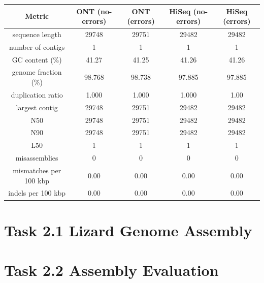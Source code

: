 \documentclass[12pt]{article}
\begin{document}
\begin{center}
\begin{tabular}{ |c|c|c|c|c| }
    \hline
    Metric & ONT (no-errors) & ONT (errors) & HiSeq (no-errors) & HiSeq (errors) \\
    \hline
    sequence length & 29748 & 29751 & 29482 & 29482 \\
    number of contigs & 1 & 1 & 1 & 1 \\
    GC content (\%) & 41.27 & 41.25 & 41.26 & 41.26  \\
    genome fraction (\%) & 98.768 & 98.738 & 97.885  & 97.885 \\
    duplication ratio & 1.000 & 1.000 & 1.000 & 1.00 \\
    largest contig & 29748 & 29751 & 29482 & 29482 \\
    N50 & 29748 & 29751 & 29482 & 29482 \\
    N90 & 29748 & 29751 & 29482 & 29482 \\
    L50 & 1 & 1 & 1 & 1 \\
    misassemblies & 0 & 0 & 0 & 0 \\
    mismatches per 100 kbp & 0.00 & 0.00 & 0.00 & 0.00 \\
    indels per 100 kbp & 0.00 & 0.00 & 0.00 & 0.00 \\
    \hline
\end{tabular}
\end{center}

\section{Task 2.1 Lizard Genome Assembly}

\section{Task 2.2 Assembly Evaluation}
\end{document}
